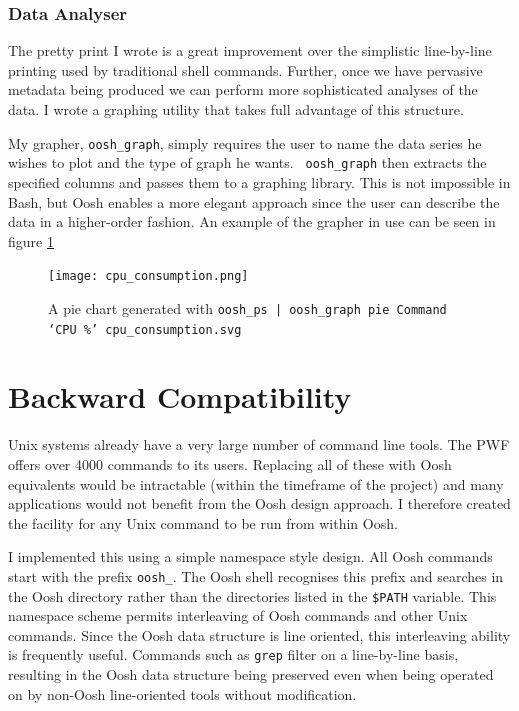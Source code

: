 \documentclass[12pt,twoside,notitlepage]{report}
\begin{document}
\subsubsection{Data Analyser}
The pretty print I wrote is a great improvement over the simplistic
line-by-line printing used by traditional shell commands. Further, once
we have pervasive metadata being produced we can perform more
sophisticated analyses of the data. I wrote a graphing utility that
takes full advantage of this structure.

My grapher, {\tt oosh\_graph}, simply requires the user to name the
data series he wishes to plot and the type of graph he wants. {\tt
  oosh\_graph} then extracts the specified columns and passes them to
a graphing library. This is not impossible in Bash, but Oosh enables a
more elegant approach since the user can describe the data in a
higher-order fashion. An example of the grapher in use can be seen in
figure \ref{piegraph}

\begin{figure}[h]
  \centering
  \texttt{[image: cpu\_consumption.png]}
  \caption{A pie chart generated with {\tt oosh\_ps | oosh\_graph pie
      Command `CPU \%' cpu\_consumption.svg}}
  \label{piegraph}
\end{figure}

\section{Backward Compatibility}

Unix systems already have a very large number of command line
tools. The PWF offers over 4000 commands to its users. Replacing all
of these with Oosh equivalents would be intractable (within the
timeframe of the project) and many applications would not benefit from
the Oosh design approach. I therefore created the facility for any
Unix command to be run from within Oosh.

I implemented this using a simple namespace style design. All Oosh
commands start with the prefix {\tt oosh\_}. The Oosh shell recognises
this prefix and searches in the Oosh directory rather than the
directories listed in the {\tt \$PATH} variable. This namespace scheme
permits interleaving of Oosh commands and other Unix commands. Since
the Oosh data structure is line oriented, this interleaving ability is
frequently useful. Commands such as {\tt grep} filter on a
line-by-line basis, resulting in the Oosh data structure being
preserved even when being operated on by non-Oosh line-oriented tools
without modification.
\end{document}
